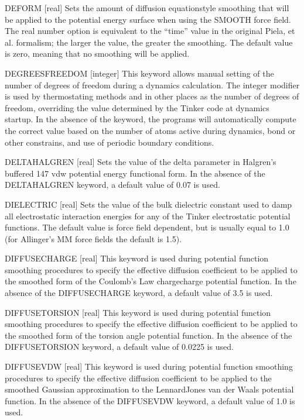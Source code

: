 \documentclass[letterpaper,11pt,english]{sphinxmanual}
\begin{document}
DEFORM {[}real{]}     Sets the amount of diffusion equation\sphinxhyphen{}style smoothing that will be applied to the potential energy surface when using the SMOOTH force field. The real number option is equivalent to the “time” value in the original Piela, et al. formalism; the larger the value, the greater the smoothing. The default value is zero, meaning that no smoothing will be applied.

DEGREES\sphinxhyphen{}FREEDOM {[}integer{]}     This keyword allows manual setting of the number of degrees of freedom during a dynamics calculation. The integer modifier is used by thermostating methods and in other places as the number of degrees of freedom, overriding the value determined by the Tinker code at dynamics startup. In the absence of the keyword, the programs will automatically compute the correct value based on the number of atoms active during dynamics, bond or other constrains, and use of periodic boundary conditions.

DELTA\sphinxhyphen{}HALGREN {[}real{]}     Sets the value of the delta parameter in Halgren’s buffered 14\sphinxhyphen{}7 vdw potential energy functional form. In the absence of the DELTA\sphinxhyphen{}HALGREN keyword, a default value of 0.07 is used.

DIELECTRIC {[}real{]}     Sets the value of the bulk dielectric constant used to damp all electrostatic interaction energies for any of the Tinker electrostatic potential functions. The default value is force field dependent, but is usually equal to 1.0 (for Allinger’s MM force fields the default is 1.5).

DIFFUSE\sphinxhyphen{}CHARGE {[}real{]}     This keyword is used during potential function smoothing procedures to specify the effective diffusion coefficient to be applied to the smoothed form of the Coulomb’s Law charge\sphinxhyphen{}charge potential function. In the absence of the DIFFUSE\sphinxhyphen{}CHARGE keyword, a default value of 3.5 is used.

DIFFUSE\sphinxhyphen{}TORSION {[}real{]}     This keyword is used during potential function smoothing procedures to specify the effective diffusion coefficient to be applied to the smoothed form of the torsion angle potential function. In the absence of the DIFFUSE\sphinxhyphen{}TORSION keyword, a default value of 0.0225 is used.

DIFFUSE\sphinxhyphen{}VDW {[}real{]}     This keyword is used during potential function smoothing procedures to specify the effective diffusion coefficient to be applied to the smoothed Gaussian approximation to the Lennard\sphinxhyphen{}Jones van der Waals potential function. In the absence of the DIFFUSE\sphinxhyphen{}VDW keyword, a default value of 1.0 is used.
\end{document}
